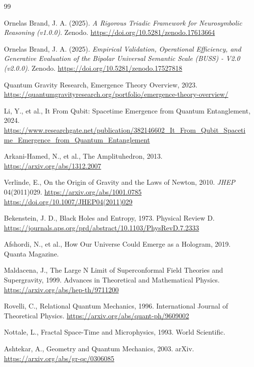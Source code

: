 \documentclass[11pt, a4paper]{article}
\begin{document}
		\begin{thebibliography}{99}
			
		
			Ornelas Brand, J. A. (2025). \textit{A Rigorous Triadic Framework for Neurosymbolic Reasoning (v1.0.0)}. Zenodo. \url{https://doi.org/10.5281/zenodo.17613664}
			
			Ornelas Brand, J. A. (2025). \textit{Empirical Validation, Operational Efficiency, and Generative Evaluation of the Bipolar Universal Semantic Scale (BUSS) - V2.0 (v2.0.0)}. Zenodo. \url{https://doi.org/10.5281/zenodo.17527818}
		
			
		
			
			Quantum Gravity Research, Emergence Theory Overview, 2023. \url{https://quantumgravityresearch.org/portfolio/emergence-theory-overview/}
			
			Li, Y., et al., It From Qubit: Spacetime Emergence from Quantum Entanglement, 2024. \url{https://www.researchgate.net/publication/382146602_It_From_Qubit_Spacetime_Emergence_from_Quantum_Entanglement}
			
			Arkani-Hamed, N., et al., The Amplituhedron, 2013. \url{https://arxiv.org/abs/1312.2007}
			
			Verlinde, E., On the Origin of Gravity and the Laws of Newton, 2010. \textit{JHEP} 04(2011)029. \url{https://arxiv.org/abs/1001.0785} \url{https://doi.org/10.1007/JHEP04(2011)029}
			
			Bekenstein, J. D., Black Holes and Entropy, 1973. Physical Review D. \url{https://journals.aps.org/prd/abstract/10.1103/PhysRevD.7.2333}
			
			Afshordi, N., et al., How Our Universe Could Emerge as a Hologram, 2019. Quanta Magazine.
			
			Maldacena, J., The Large N Limit of Superconformal Field Theories and Supergravity, 1999. Advances in Theoretical and Mathematical Physics. \url{https://arxiv.org/abs/hep-th/9711200}
			
			Rovelli, C., Relational Quantum Mechanics, 1996. International Journal of Theoretical Physics. \url{https://arxiv.org/abs/quant-ph/9609002}
			
			Nottale, L., Fractal Space-Time and Microphysics, 1993. World Scientific.
			
			Ashtekar, A., Geometry and Quantum Mechanics, 2003. arXiv. \url{https://arxiv.org/abs/gr-qc/0306085}
			

\end{thebibliography}
\end{document}
